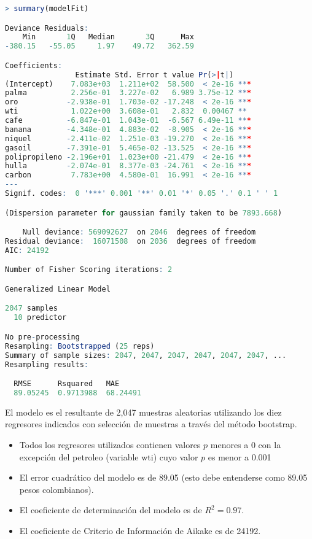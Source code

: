 \begin{lstlisting}[language=R]
> summary(modelFit)

Deviance Residuals:
    Min       1Q   Median       3Q      Max
-380.15   -55.05     1.97    49.72   362.59

Coefficients:
                Estimate Std. Error t value Pr(>|t|)
(Intercept)    7.083e+03  1.211e+02  58.500  < 2e-16 ***
palma          2.256e-01  3.227e-02   6.989 3.75e-12 ***
oro           -2.938e-01  1.703e-02 -17.248  < 2e-16 ***
wti            1.022e+00  3.608e-01   2.832  0.00467 **
cafe          -6.847e-01  1.043e-01  -6.567 6.49e-11 ***
banana        -4.348e-01  4.883e-02  -8.905  < 2e-16 ***
niquel        -2.411e-02  1.251e-03 -19.270  < 2e-16 ***
gasoil        -7.391e-01  5.465e-02 -13.525  < 2e-16 ***
polipropileno -2.196e+01  1.023e+00 -21.479  < 2e-16 ***
hulla         -2.074e-01  8.377e-03 -24.761  < 2e-16 ***
carbon         7.783e+00  4.580e-01  16.991  < 2e-16 ***
---
Signif. codes:  0 '***' 0.001 '**' 0.01 '*' 0.05 '.' 0.1 ' ' 1

(Dispersion parameter for gaussian family taken to be 7893.668)

    Null deviance: 569092627  on 2046  degrees of freedom
Residual deviance:  16071508  on 2036  degrees of freedom
AIC: 24192

Number of Fisher Scoring iterations: 2

Generalized Linear Model

2047 samples
  10 predictor

No pre-processing
Resampling: Bootstrapped (25 reps)
Summary of sample sizes: 2047, 2047, 2047, 2047, 2047, 2047, ...
Resampling results:

  RMSE      Rsquared   MAE
  89.05245  0.9713988  68.24491

\end{lstlisting}

El modelo es el resultante de 2,047 muestras aleatorias utilizando los diez regresores indicados con selección de muestras a través del método bootstrap.

\begin{itemize}
  \item Todos los regresores utilizados contienen valores $p$ menores a 0 con la excepción del petroleo (variable wti) cuyo valor $p$ es menor a 0.001
  \item El error cuadrático del modelo es de 89.05 (esto debe entenderse como 89.05 pesos colombianos).
  \item El coeficiente de determinación del modelo es de $R^2 = 0.97$.
  \item El coeficiente de Criterio de Información de Aikake es de 24192.
\end{itemize}

